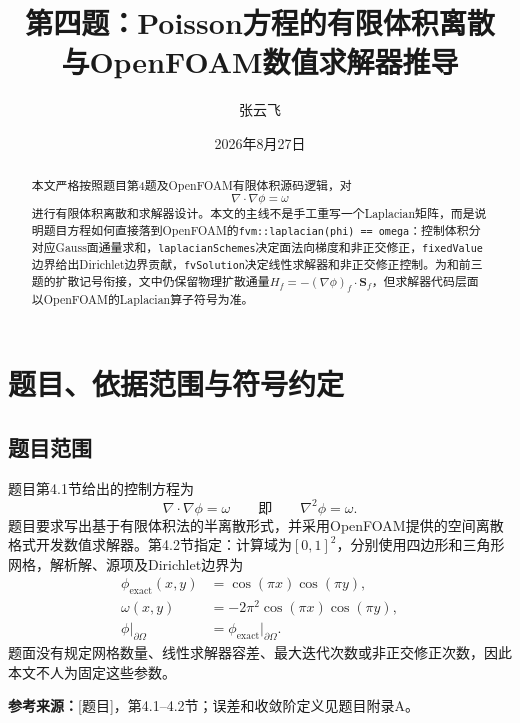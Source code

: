 \documentclass[UTF8,12pt,a4paper]{ctexart}
\title{\bfseries 第四题：Poisson方程的有限体积离散\\与OpenFOAM数值求解器推导}
\author{张云飞}
\date{2026年8月27日}
\numberwithin{equation}{section}
\newcommand{\Task}{\textnormal{[题目]}}
\newcommand{\source}[1]{%
  \par\smallskip
  \noindent\colorbox{sourcebg}{%
    \parbox{0.955\linewidth}{\footnotesize\color{sourcegray}\textbf{参考来源：}#1}%
  }
  \par\smallskip
}
\begin{document}
\maketitle

\begin{abstract}
本文严格按照题目第4题及OpenFOAM有限体积源码逻辑，对
\[
  \nabla\cdot\nabla\phi=\omega
\]
进行有限体积离散和求解器设计。本文的主线不是手工重写一个Laplacian矩阵，而是说明题目方程如何直接落到OpenFOAM的\texttt{fvm::laplacian(phi) == omega}：控制体积分对应Gauss面通量求和，\texttt{laplacianSchemes}决定面法向梯度和非正交修正，\texttt{fixedValue}边界给出Dirichlet边界贡献，\texttt{fvSolution}决定线性求解器和非正交修正控制。为和前三题的扩散记号衔接，文中仍保留物理扩散通量$H_f=-(\nabla\phi)_f\cdot\bm S_f$，但求解器代码层面以OpenFOAM的Laplacian算子符号为准。
\end{abstract}

\tableofcontents
\newpage

\section*{题目、依据范围与符号约定}

\subsection*{题目范围}

题目第4.1节给出的控制方程为
\begin{equation}
  \nabla\cdot\nabla\phi=\omega
  \qquad\text{即}\qquad
  \nabla^2\phi=\omega.
  \label{eq:governing}
\end{equation}
题目要求写出基于有限体积法的半离散形式，并采用OpenFOAM提供的空间离散格式开发数值求解器。第4.2节指定：计算域为$[0,1]^2$，分别使用四边形和三角形网格，解析解、源项及Dirichlet边界为
\begin{align}
  \phi_{\mathrm{exact}}(x,y)
  &=\cos(\pi x)\cos(\pi y),
  \label{eq:exact_given}\\
  \omega(x,y)
  &=-2\pi^2\cos(\pi x)\cos(\pi y),
  \label{eq:source_given}\\
  \phi|_{\partial\Omega}
  &=\phi_{\mathrm{exact}}|_{\partial\Omega}.
  \label{eq:dirichlet_given}
\end{align}
题面没有规定网格数量、线性求解器容差、最大迭代次数或非正交修正次数，因此本文不人为固定这些参数。

\source{\Task，第4.1--4.2节；误差和收敛阶定义见题目附录A。}
\end{document}
